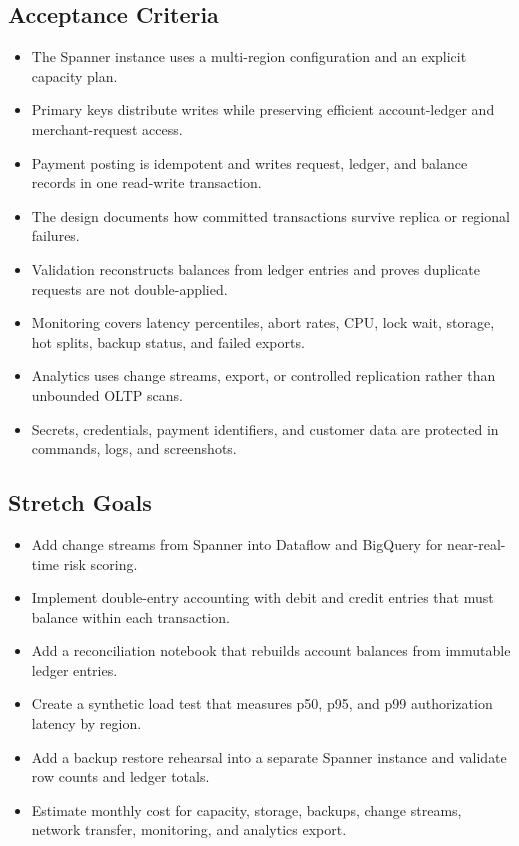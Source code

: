 \subsection*{Acceptance Criteria}
\begin{itemize}
    \item The Spanner instance uses a multi-region configuration and an explicit capacity plan.
    \item Primary keys distribute writes while preserving efficient account-ledger and merchant-request access.
    \item Payment posting is idempotent and writes request, ledger, and balance records in one read-write transaction.
    \item The design documents how committed transactions survive replica or regional failures.
    \item Validation reconstructs balances from ledger entries and proves duplicate requests are not double-applied.
    \item Monitoring covers latency percentiles, abort rates, CPU, lock wait, storage, hot splits, backup status, and failed exports.
    \item Analytics uses change streams, export, or controlled replication rather than unbounded OLTP scans.
    \item Secrets, credentials, payment identifiers, and customer data are protected in commands, logs, and screenshots.
\end{itemize}

\subsection*{Stretch Goals}
\begin{itemize}
    \item Add change streams from Spanner into Dataflow and BigQuery for near-real-time risk scoring.
    \item Implement double-entry accounting with debit and credit entries that must balance within each transaction.
    \item Add a reconciliation notebook that rebuilds account balances from immutable ledger entries.
    \item Create a synthetic load test that measures p50, p95, and p99 authorization latency by region.
    \item Add a backup restore rehearsal into a separate Spanner instance and validate row counts and ledger totals.
    \item Estimate monthly cost for capacity, storage, backups, change streams, network transfer, monitoring, and analytics export.
\end{itemize}
